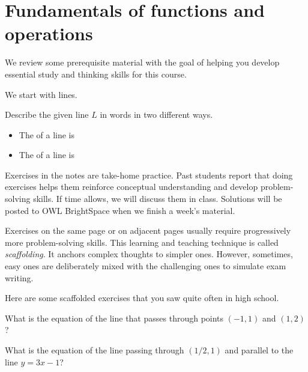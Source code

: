 \documentclass[../main.tex]{subfiles}
\begin{document}
 \section{Fundamentals of functions and operations}

We review some prerequisite material with the goal of helping you develop essential study and thinking skills for this course.

We start with lines.
\begin{example} \label{eg:review-lines}
  Describe the given line \(L\) in words in two different ways.

  

  \begin{itemize}[wide]
    \item The  of a line is


    \item The  of a line is

  \end{itemize}
\end{example}
\clearpage

Exercises in the notes are take-home practice. Past students report that doing exercises helps them reinforce conceptual understanding and develop problem-solving skills. If time allows, we will discuss them in class. Solutions will be posted to OWL BrightSpace when we finish a week's material.

Exercises on the same page or on adjacent pages usually require progressively more problem-solving skills.  This learning and teaching technique is called \emph{scaffolding}. It anchors complex thoughts to simpler ones.  However, sometimes, easy ones are deliberately mixed with the challenging ones to simulate exam writing.

Here are some scaffolded exercises that you saw quite often in high school.

\begin{exercise}
  What is the equation of the line that passes through points \((-1,1)\) and \((1,2)\)?

\end{exercise}

\begin{exercise}
  What is the equation of the line passing through \((1/2,1)\) and parallel to the line \(y = 3x - 1\)?

\end{exercise}
\end{document}
